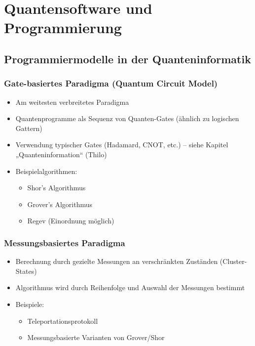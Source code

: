 \chapter{Quantensoftware und Programmierung}
\label{programming} %



\section{Programmiermodelle in der Quanteninformatik}

\subsection{Gate-basiertes Paradigma (Quantum Circuit Model)}
\begin{itemize}
    \item Am weitesten verbreitetes Paradigma
    \item Quantenprogramme als Sequenz von Quanten-Gates (ähnlich zu logischen Gattern)
    \item Verwendung typischer Gates (Hadamard, CNOT, etc.) – siehe Kapitel „Quanteninformation“ (Thilo)
    \item Beispielalgorithmen:
    \begin{itemize}
        \item Shor's Algorithmus
        \item Grover's Algorithmus
        \item Regev (Einordnung möglich)
    \end{itemize}
\end{itemize}

\subsection{Messungsbasiertes Paradigma}
\begin{itemize}
    \item Berechnung durch gezielte Messungen an verschränkten Zuständen (Cluster-States)
    \item Algorithmus wird durch Reihenfolge und Auswahl der Messungen bestimmt
    \item Beispiele:
    \begin{itemize}
        \item Teleportationsprotokoll
        \item Messungsbasierte Varianten von Grover/Shor
    \end{itemize}
\end{itemize}

